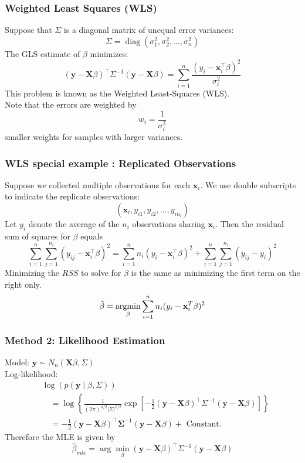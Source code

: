 \documentclass[11pt,a4paper]{article}
\newcommand{\argmin}{\operatornamewithlimits{argmin}}
\begin{document}
\subsubsection{Weighted Least Squares (WLS)}
Suppose that $\Sigma$ is a diagonal matrix of unequal error variances:
$$
\Sigma=\operatorname{diag}\left(\sigma_{1}^{2}, \sigma_{2}^{2}, \ldots, \sigma_{n}^{2}\right)
$$
The GLS estimate of $\beta$ minimizes:
$$
(\mathbf{y}-\mathbf{X} \beta)^{\top} \Sigma^{-1}(\mathbf{y}-\mathbf{X} \beta)=\sum_{i=1}^{n} \frac{\left(y_{i}-\mathbf{x}_{i}^{\top} \beta\right)^{2}}{\sigma_{i}^{2}}
$$
This problem is known as the Weighted Least-Squares (WLS).\\
Note that the errors are weighted by
$$
w_{i}=\frac{1}{\sigma_{i}^{2}}
$$
smaller weights for samples with larger variances.

\subsubsection{WLS special example : Replicated Observations}
Suppose we collected multiple observations for each $\mathbf{x}_{i}$. We use double subscripts to indicate the replicate observations:
$$
\left(\mathbf{x}_{i}, y_{i 1}, y_{i 2}, \ldots, y_{i n_{i}}\right)
$$
Let $y_{i}$ denote the average of the $n_{i}$ observations sharing $\mathbf{x}_{i}$. Then the residual sum of squares for $\beta$ equals
$$
\sum_{i=1}^{n} \sum_{j=1}^{n_{i}}\left(y_{i j}-\mathbf{x}_{i}^{\top} \beta\right)^{2}=\sum_{i=1}^{n} n_{i}\left(y_{i}-\mathbf{x}_{i}^{\top} \beta\right)^{2}+\sum_{i=1}^{n} \sum_{j=1}^{n_{i}}\left(y_{i j}-y_{i}\right)^{2}
$$
Minimizing the $RSS$ to solve for $\beta$ is the same as minimizing the ﬁrst term on the right only.
$$\hat{\beta}=\argmin_\beta \sum_{i=1}^n n_i(y_i-\mathbf{x}_i^T\beta)^2$$

\subsubsection{Method 2: Likelihood Estimation}
Model: $\mathbf{y} \sim N_{n}(\mathbf{X} \beta, \Sigma)$\\
Log-likelihood:
$$
\begin{aligned}
&\log (p(\mathbf{y} \mid \beta, \Sigma)) \\
&\quad=\log \left\{\frac{1}{(2 \pi)^{n / 2}|\Sigma|^{1 / 2}} \exp \left[-\frac{1}{2}(\mathbf{y}-\mathbf{X} \beta)^{\top} \Sigma^{-1}(\mathbf{y}-\mathbf{X} \beta)\right]\right\} \\
&\quad=-\frac{1}{2}(\mathbf{y}-\mathbf{X} \beta)^{\top} \boldsymbol{\Sigma}^{-1}(\mathbf{y}-\mathbf{X} \beta)+\text { Constant. }
\end{aligned}
$$
Therefore the MLE is given by
$$
\hat{\beta}_{m l e}=\arg \min _{\beta}(\mathbf{y}-\mathbf{X} \beta)^{\top} \Sigma^{-1}(\mathbf{y}-\mathbf{X} \beta)
$$
\end{document}
